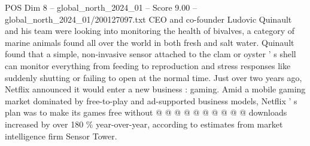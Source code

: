 \begin{textsample}{POS Dim 8 – global\_north\_2024\_01 – Score 9.00 – global\_north\_2024\_01/200127097.txt}
CEO and co-founder Ludovic Quinault and his team were looking into monitoring the health of bivalves, a category of marine animals found all over the world in both fresh and salt water.
Quinault found that a simple, non-invasive sensor attached to the clam or oyster ' s shell can monitor everything from feeding to reproduction and stress responses like suddenly shutting or failing to open at the normal time.
Just over two years ago, Netflix announced it would enter a new business : gaming.
Amid a mobile gaming market dominated by free-to-play and ad-supported business models, Netflix ' s plan was to make its games free without @ @ @ @ @ @ @ @ @ @ downloads increased by over 180 \% year-over-year, according to estimates from market intelligence firm Sensor Tower.

\end{textsample}
